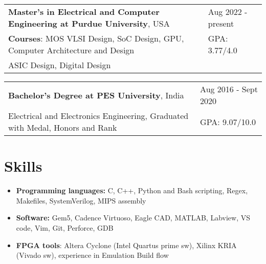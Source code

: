 \documentclass[a4paper,10pt]{article}
\begin{document}
\begin{tabularx}{\linewidth}{ @{}l X@{} }
\textbf{Master's in Electrical and Computer Engineering at Purdue University}, USA & \hfill Aug 2022 - present \\[2.75pt]
\textbf{Courses}: MOS VLSI Design, SoC Design, GPU, Computer Architecture and Design &  \hfill GPA: 3.77/4.0\\
ASIC Design, Digital Design \end{tabularx}

\begin{tabularx}{\linewidth}{ @{}l X@{} }
\textbf{Bachelor's Degree at PES University}, India & \hfill Aug 2016 - Sept 2020 \\[2.75pt]
Electrical and Electronics Engineering, Graduated with Medal, Honors and Rank & \hfill GPA: 9.07/10.0
\end{tabularx}

\section{Skills}
\begin{minipage}[t]{\linewidth}
    \begin{itemize}[nosep, leftmargin=2em, itemsep=3pt]
    
    \item \textbf{Programming languages:} C, C++, Python and Bash scripting, Regex, Makefiles, SystemVerilog, MIPS assembly

    \item \textbf{Software:} Gem5, Cadence Virtuoso, Eagle CAD, MATLAB, Labview, VS code, Vim, Git, Perforce, GDB
    
    \item \textbf{FPGA tools}: Altera Cyclone (Intel Quartus prime sw), Xilinx KRIA (Vivado sw), experience in Emulation Build flow
    
    \end{itemize}
\end{minipage} 
\end{document}
